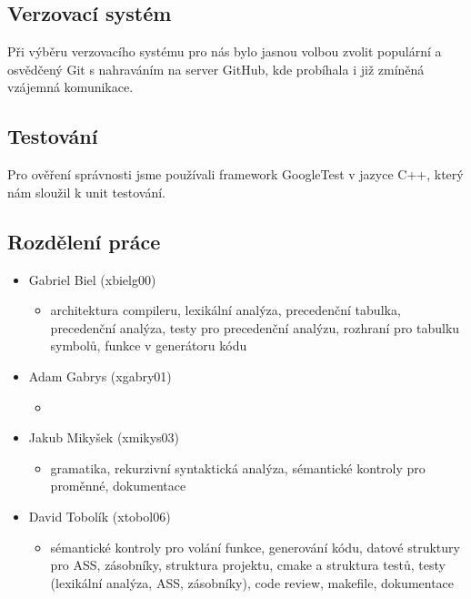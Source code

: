 \documentclass[a4paper, 12pt]{article}
\begin{document}
        \subsection{Verzovací systém}
            Při výběru verzovacího systému pro nás bylo jasnou volbou zvolit populární a osvědčený Git s nahraváním na server GitHub, kde probíhala i již zmíněná vzájemná komunikace.
        \subsection{Testování}
            Pro ověření správnosti jsme používali framework GoogleTest v jazyce C++, který nám sloužil k unit testování.
        \subsection{Rozdělení práce}
            \begin{itemize}
                \item Gabriel Biel (xbielg00)
                    \begin{itemize}
                        \item architektura compileru, lexikální analýza, precedenční tabulka, precedenční analýza, testy pro precedenční analýzu, rozhraní pro tabulku symbolů, funkce v generátoru kódu
                    \end{itemize}
                \item Adam Gabrys (xgabry01)
                    \begin{itemize}
                        \item
                    \end{itemize}
                \item Jakub Mikyšek (xmikys03)
                    \begin{itemize}
                        \item gramatika, rekurzivní syntaktická analýza, sémantické kontroly pro proměnné, dokumentace
                    \end{itemize}
                \item David Tobolík (xtobol06)
                    \begin{itemize}
                        \item sémantické kontroly pro volání funkce, generování kódu, datové struktury pro ASS, zásobníky, struktura projektu, cmake a struktura testů, testy (lexikální analýza, ASS, zásobníky), code review, makefile, dokumentace
                    \end{itemize}
            \end{itemize}
\end{document}
